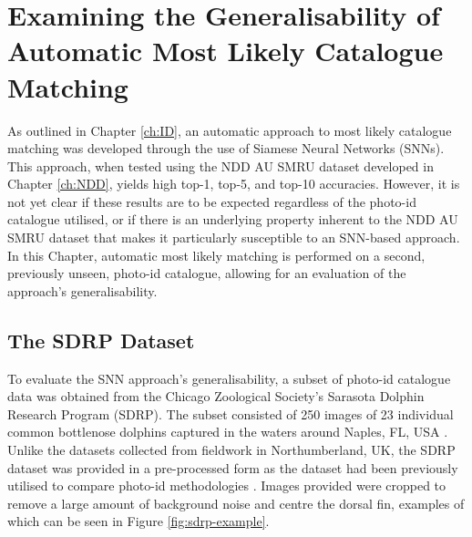 \chapter{Examining the Generalisability of Automatic Most Likely Catalogue Matching}\label{ch:SNNGeneralisation}

As outlined in Chapter \ref{ch:ID}, an automatic approach to most likely catalogue matching was developed through the use of Siamese Neural Networks (SNNs). This approach, when tested using the NDD AU SMRU dataset developed in Chapter \ref{ch:NDD}, yields high top-1, top-5, and top-10 accuracies. However, it is not yet clear if these results are to be expected regardless of the photo-id catalogue utilised, or if there is an underlying property inherent to the NDD AU SMRU dataset that makes it particularly susceptible to an SNN-based approach. In this Chapter, automatic most likely matching is performed on a second, previously unseen, photo-id catalogue, allowing for an evaluation of the approach's generalisability.

\section{The SDRP Dataset}\label{ch:SNNGeneralisation,sec:SDRPDataset}

To evaluate the SNN approach's generalisability, a subset of photo-id catalogue data was obtained from the Chicago Zoological Society's Sarasota Dolphin Research Program (SDRP). The subset consisted of 250 images of 23 individual common bottlenose dolphins captured in the waters around Naples, FL, USA \cite{tyson_moore_final_2020}. Unlike the datasets collected from fieldwork in Northumberland, UK, the SDRP dataset was provided in a pre-processed form as the dataset had been previously utilised to compare photo-id methodologies \cite{tyson_moore_rise_2022}. Images provided were cropped to remove a large amount of background noise and centre the dorsal fin, examples of which can be seen in Figure \ref{fig:sdrp-example}. 

